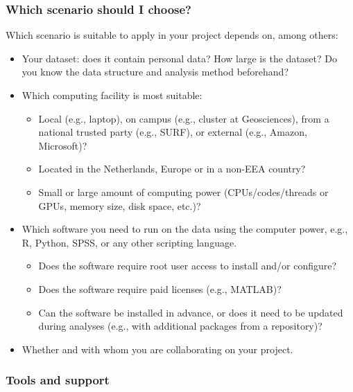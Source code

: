 \documentclass[
]{book}
\providecommand{\tightlist}{%
  \setlength{\itemsep}{0pt}\setlength{\parskip}{0pt}}
\begin{document}
\hypertarget{which-scenario-should-i-choose}{%
\subsubsection{Which scenario should I choose?}\label{which-scenario-should-i-choose}}

Which scenario is suitable to apply in your project depends on, among others:

\begin{itemize}
\tightlist
\item
  Your dataset: does it contain personal data? How large is the dataset? Do you
  know the data structure and analysis method beforehand?
\item
  Which computing facility is most suitable:

  \begin{itemize}
  \tightlist
  \item
    Local (e.g., laptop), on campus (e.g., cluster at Geosciences), from a
    national trusted party (e.g., SURF), or external (e.g., Amazon, Microsoft)?
  \item
    Located in the Netherlands, Europe or in a non-EEA country?
  \item
    Small or large amount of computing power (CPUs/codes/threads or GPUs, memory
    size, disk space, etc.)?
  \end{itemize}
\item
  Which software you need to run on the data using the computer power, e.g., R,
  Python, SPSS, or any other scripting language.

  \begin{itemize}
  \tightlist
  \item
    Does the software require root user access to install and/or configure?
  \item
    Does the software require paid licenses (e.g., MATLAB)?
  \item
    Can the software be installed in advance, or does it need to be updated
    during analyses (e.g., with additional packages from a repository)?
  \end{itemize}
\item
  Whether and with whom you are collaborating on your project.
\end{itemize}

\hypertarget{computation-support}{%
\subsubsection{Tools and support}\label{computation-support}}
\end{document}
